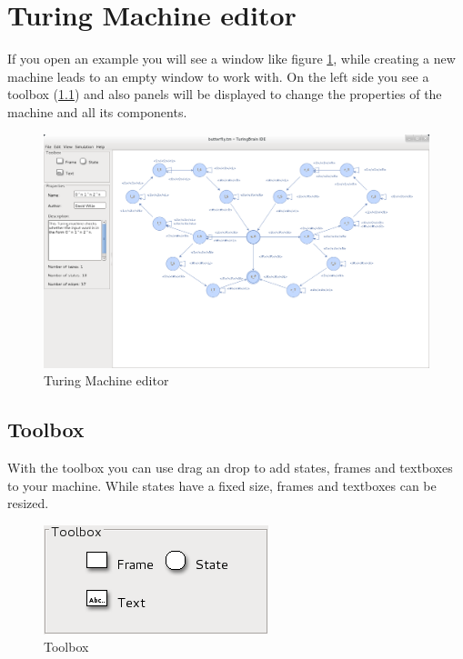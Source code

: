 \documentclass[%
  a4paper,%
  11pt,%
  blue,%
  hyperref	%
  ]{tubsartcl}
\begin{document}
\section{Turing Machine editor}
If you open an example you will see a window like figure \ref{pic:turing_editor}, while creating a new machine leads to an empty window to work with. On the left side you see a toolbox (\ref{sec:toolbox}) and also panels will be displayed to change the properties of the machine and all its components.
\begin{figure}[!htb]
\begin{center}
\includegraphics[scale=0.3]{graphics_gui/turing_editor.png}
\end{center}
\caption{Turing Machine editor}
\label{pic:turing_editor}
\end{figure}

\subsection{Toolbox}
\label{sec:toolbox}
With the toolbox you can use drag an drop to add states, frames and textboxes to your machine. While states have a fixed size, frames and textboxes can be resized.
\begin{figure}[!htb]
\begin{center}
\includegraphics[scale=0.5]{graphics_gui/toolbox_turing.png}
\end{center}
\caption{Toolbox}
\label{pic:toolbox}
\end{figure}
\end{document}
